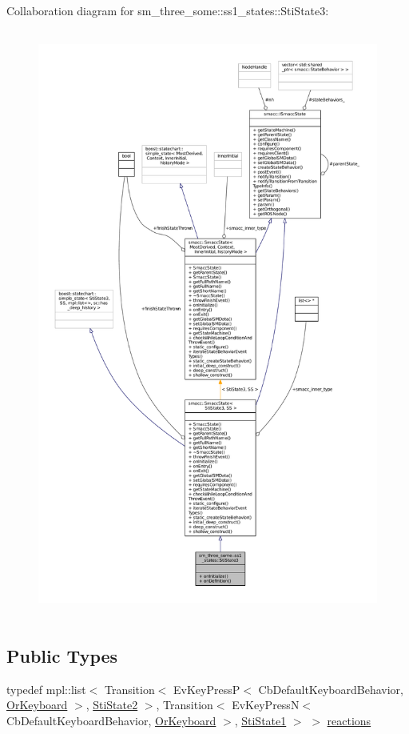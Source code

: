 Collaboration diagram for sm\+\_\+three\+\_\+some\+:\+:ss1\+\_\+states\+:\+:Sti\+State3\+:
\nopagebreak
\begin{figure}[H]
\begin{center}
\leavevmode
\includegraphics[height=550pt]{structsm__three__some_1_1ss1__states_1_1StiState3__coll__graph}
\end{center}
\end{figure}
\subsection*{Public Types}
\begin{DoxyCompactItemize}
\item 
typedef mpl\+::list$<$ Transition$<$ Ev\+Key\+PressP$<$ Cb\+Default\+Keyboard\+Behavior, \hyperlink{classsm__three__some_1_1OrKeyboard}{Or\+Keyboard} $>$, \hyperlink{structsm__three__some_1_1ss1__states_1_1StiState2}{Sti\+State2} $>$, Transition$<$ Ev\+Key\+PressN$<$ Cb\+Default\+Keyboard\+Behavior, \hyperlink{classsm__three__some_1_1OrKeyboard}{Or\+Keyboard} $>$, \hyperlink{structsm__three__some_1_1ss1__states_1_1StiState1}{Sti\+State1} $>$ $>$ \hyperlink{structsm__three__some_1_1ss1__states_1_1StiState3_a2672f9f53573401ff5b62b95bf4d7b47}{reactions}
\end{DoxyCompactItemize}
